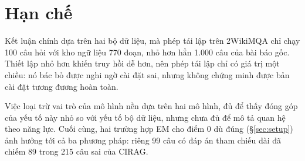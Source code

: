 \documentclass[11pt]{article}
\begin{document}
\section*{Hạn chế}

Kết luận chính dựa trên hai bộ dữ liệu, mà phép tái lập trên 2WikiMQA chỉ chạy 100 câu
hỏi với kho ngữ liệu 770 đoạn, nhỏ hơn hẳn 1.000 câu của bài báo gốc. Thiết lập nhỏ hơn
khiến truy hồi dễ hơn, nên phép tái lập chỉ có giá trị một chiều: nó bác bỏ được nghi ngờ
cài đặt sai, nhưng không chứng minh được bản cài đặt tương đương hoàn toàn.

Việc loại trừ vai trò của mô hình nền dựa trên hai mô hình, đủ để thấy đóng góp của yếu tố
này nhỏ so với yếu tố bộ dữ liệu, nhưng chưa đủ để mô tả quan hệ theo năng lực. Cuối cùng, hai trường hợp EM cho điểm 0 dù đúng (\S\ref{sec:setup}) ảnh
hưởng tới cả ba phương pháp: riêng 99 câu có đáp án tham chiếu dài đã chiếm 89 trong 215
câu sai của CIRAG.


\end{document}
